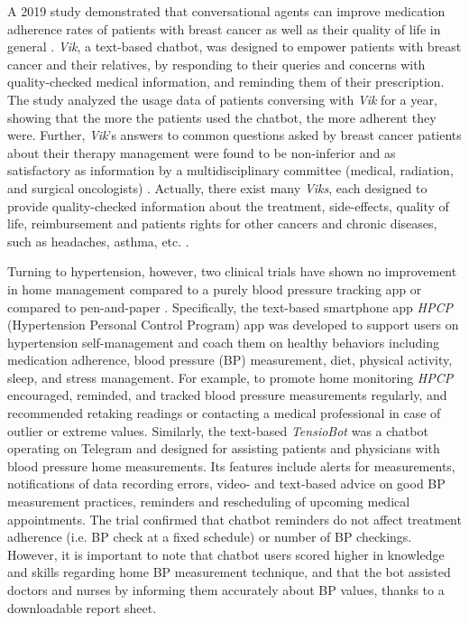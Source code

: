 A 2019 study demonstrated that conversational agents can improve medication adherence rates of patients with breast cancer as well as their quality of life in general \cite{vik2019}. \textit{Vik}, a text-based chatbot, was designed to empower patients with breast cancer and their relatives, by responding to their queries and concerns with quality-checked medical information, and reminding them of their prescription. The study analyzed the usage data of patients conversing with \textit{Vik} for a year, showing that the more the patients used the chatbot, the more adherent they were. Further, \textit{Vik}'s answers to common questions asked by breast cancer patients about their therapy management were found to be non-inferior and as satisfactory as information by a multidisciplinary committee (medical, radiation, and surgical oncologists) \cite{vik2019b}. Actually, there exist many \textit{Viks}, each designed to provide quality-checked information about the treatment, side-effects, quality of life, reimbursement and patients rights for other cancers and chronic diseases, such as headaches, asthma, etc. \cite{vik2020}. 

Turning to hypertension, however, two clinical trials have shown no improvement in home management compared to a purely blood pressure tracking app \cite{rcthypertension2020} or compared to pen-and-paper \cite{tensiobot2021}. Specifically, the text-based smartphone app \textit{HPCP} (Hypertension Personal Control Program) app was developed to support users on hypertension self-management and coach them on healthy behaviors including medication adherence, blood pressure (BP) measurement, diet, physical activity, sleep, and stress management. For example, to promote home monitoring \textit{HPCP} encouraged, reminded, and tracked blood pressure measurements regularly, and recommended retaking readings or contacting a medical professional in case of outlier or extreme values. Similarly, the text-based \textit{TensioBot} was a chatbot operating on Telegram and designed for assisting patients and physicians with blood pressure home measurements. Its features include alerts for measurements, notifications of data recording errors, video- and text-based advice on good BP measurement practices, reminders and rescheduling of upcoming medical appointments. The trial confirmed that chatbot reminders do not affect treatment adherence (i.e. BP check at a fixed schedule) or number of BP checkings. However, it is important to note that chatbot users scored higher in knowledge and skills regarding home BP measurement technique, and that the bot assisted doctors and nurses by informing them accurately about BP values, thanks to a downloadable report sheet.


